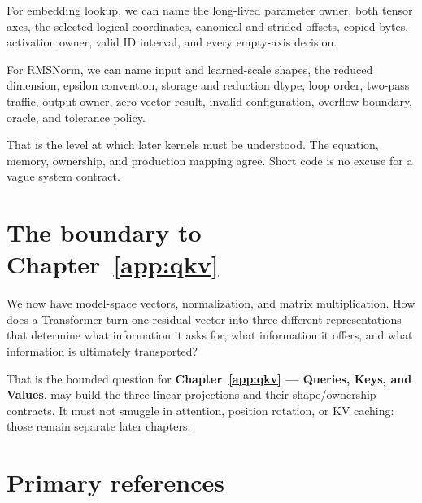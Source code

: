 For embedding lookup, we can name the long-lived parameter owner, both
tensor axes, the selected logical coordinates, canonical and strided
offsets, copied bytes, activation owner, valid ID interval, and every
empty-axis decision.

For RMSNorm, we can name input and learned-scale shapes, the reduced
dimension, epsilon convention, storage and reduction dtype, loop order,
two-pass traffic, output owner, zero-vector result, invalid
configuration, overflow boundary, oracle, and tolerance policy.

That is the level at which later kernels must be understood. The
equation, memory, ownership, and production mapping agree. Short code is
no excuse for a vague system contract.

\section{The boundary to Chapter~\ref{app:qkv}}\label{the-boundary-to-chapter-8}

We now have model-space vectors, normalization, and matrix
multiplication. How does a Transformer turn one residual vector into
three different representations that determine what information it asks
for, what information it offers, and what information is ultimately
transported?

That is the bounded question for \textbf{Chapter~\ref{app:qkv} --- Queries, Keys,
and Values}.  may build the three linear projections and their
shape/ownership contracts. It must not smuggle in attention, position
rotation, or KV caching: those remain separate later chapters.

\section{Primary references}\label{primary-references-2}

